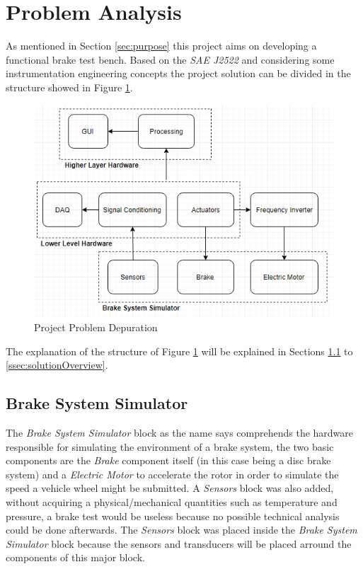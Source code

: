 \section{Problem Analysis}\label{sec:problem-analsysis}

	As mentioned in Section \ref{sec:purpose} this project aims on developing a functional brake test bench. Based on the \textit{SAE J2522} \cite{sae} and considering some instrumentation engineering concepts the project solution can be divided in the structure showed in Figure \ref{fig:projectProblem}.
	
	\begin{figure}[htbp]
		\centering
			\includegraphics[scale=0.9]{figuras/fig-projectProblem}
		\caption{Project Problem Depuration \cite{projectProblem}}
		\label{fig:projectProblem}
	\end{figure}
	
	The explanation of the structure of Figure \ref{fig:projectProblem} will be explained in Sections \ref{ssec:brakeSystemSimulator} to \ref{ssec:solutionOverview}.

	\subsection{Brake System Simulator}\label{ssec:brakeSystemSimulator}
		
		The \textit{Brake System Simulator} block as the name says comprehends the hardware responsible for simulating the environment of a brake system, the two basic components are the \textit{Brake} component itself (in this case being a disc brake system) and a \textit{Electric Motor} to accelerate the rotor in order to simulate the speed a vehicle wheel might be submitted. A \textit{Sensors} block was also added, without acquiring a physical/mechanical quantities such as temperature and pressure, a brake test would be useless because no possible technical analysis could be done afterwards. The \textit{Sensors} block was placed inside the \textit{Brake System Simulator} block because the sensors and transducers will be placed arround the components of this major block.

